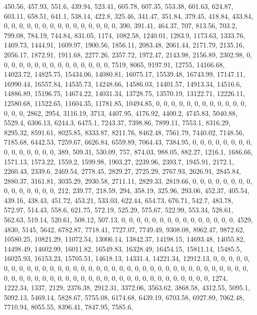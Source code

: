 \documentclass[
]{article}
\begin{document}
450.56, 457.93, 551.6, 439.94, 523.41, 605.78, 607.35, 553.38, 601.63,
624.87, 603.11, 658.51, 641.1, 538.14, 422.8, 325.46, 341.47, 351.84,
379.45, 418.84, 433.84, 0, 0, 0, 0, 0, 0, 0, 0, 0, 0, 0, 0, 0, 0, 0,
390, 391.41, 464.37, 707, 813.56, 703.2, 799.08, 784.19, 744.84, 831.05,
1174, 1082.58, 1240.01, 1283.9, 1173.63, 1333.76, 1469.73, 1444.91,
1609.97, 1900.56, 1856.11, 2083.48, 2061.44, 2171.79, 2135.16, 2056.17,
1872.91, 1911.68, 2277.26, 2357.72, 1972.47, 2143.98, 2156.89, 2302.98,
0, 0, 0, 0, 0, 0, 0, 0, 0, 0, 0, 0, 0, 0, 0, 7519, 8065, 9197.91, 12755,
14166.68, 14023.72, 14825.75, 15434.06, 14080.81, 16075.17, 15539.48,
16743.99, 17147.11, 16990.44, 16557.84, 14535.73, 14248.66, 14586.03,
14401.57, 14913.34, 14516.6, 14886.89, 15196.75, 14674.22, 14031.34,
13728.75, 13570.19, 13122.71, 12226.11, 12580.68, 11522.65, 11604.35,
11781.85, 10494.85, 0, 0, 0, 0, 0, 0, 0, 0, 0, 0, 0, 0, 0, 0, 0, 2862,
2954, 3116.19, 3713, 4407.95, 4176.92, 4400.2, 4745.83, 5040.88, 5529.4,
6306.13, 6244.3, 6475.1, 7243.37, 7398.86, 7899.11, 7553.1, 8316.29,
8295.32, 8591.61, 8025.85, 8333.87, 8211.76, 8462.48, 7561.79, 7440.02,
7148.56, 7185.68, 6442.53, 7259.67, 6626.84, 6559.89, 7064.43, 7384.95,
0, 0, 0, 0, 0, 0, 0, 0, 0, 0, 0, 0, 0, 0, 0, 389, 509.31, 530.09, 757,
874.03, 988.05, 882.27, 1216.1, 1686.66, 1571.13, 1573.22, 1559.2,
1599.98, 1903.27, 2239.96, 2393.7, 1945.91, 2172.1, 2260.43, 2339.6,
2469.54, 2778.45, 2829.27, 2725.29, 2767.93, 2626.91, 2845.84, 2880.37,
3161.81, 3035.29, 2930.58, 2711.11, 2829.33, 2819.66, 0, 0, 0, 0, 0, 0,
0, 0, 0, 0, 0, 0, 0, 0, 0, 212, 239.77, 218.59, 294, 358.19, 325.96,
293.06, 452.37, 405.54, 439.16, 438.43, 451.72, 453.21, 533.03, 622.44,
654.73, 676.71, 542.7, 483.78, 572.97, 514.43, 558.6, 621.75, 572.19,
525.29, 575.67, 522.99, 553.34, 528.61, 562.63, 519.14, 520.61, 508.12,
507.13, 0, 0, 0, 0, 0, 0, 0, 0, 0, 0, 0, 0, 0, 0, 0, 4529, 4830, 5145,
5642, 6782.87, 7718.41, 7727.07, 7749.49, 9308.08, 8962.47, 9872.62,
10580.25, 10821.29, 11072.54, 13006.14, 13842.37, 14198.15, 14693.48,
14055.82, 14498.49, 14602.99, 16011.82, 16549.83, 16328.49, 16454.15,
15811.14, 15485.5, 16025.93, 16153.23, 15705.51, 14618.13, 14331.4,
14221.34, 12912.13, 0, 0, 0, 0, 0, 0, 0, 0, 0, 0, 0, 0, 0, 0, 0, 0, 0,
0, 0, 0, 0, 0, 0, 0, 0, 0, 0, 0, 0, 0, 0, 0, 0, 0, 0, 0, 0, 0, 0, 0, 0,
0, 0, 0, 0, 0, 0, 0, 0, 0, 0, 0, 0, 0, 0, 0, 0, 0, 0, 0, 0, 0, 0, 0,
1274, 1222.34, 1337, 2129, 2376.38, 2912.31, 3372.06, 3563.62, 3868.58,
4312.55, 5095.1, 5092.13, 5469.14, 5828.67, 5755.08, 6174.68, 6439.19,
6703.58, 6927.89, 7062.48, 7710.94, 8055.55, 8396.41, 7847.95, 7585.6,
\end{document}
